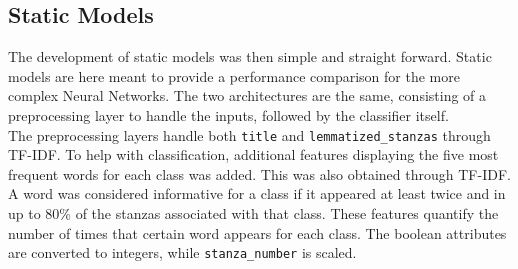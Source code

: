 \subsection*{Static Models}

The development of static models was then simple and straight forward.
Static models are here meant to provide a performance comparison
for the more complex Neural Networks.
The two architectures are the same, consisting of a preprocessing
layer to handle the inputs, followed by the classifier itself.\\

The preprocessing layers handle both \texttt{title} and
\texttt{lemmatized\_stanzas} through TF-IDF. 
To help with classification, additional features displaying the five most
frequent words for each class was added.
This was also obtained through TF-IDF.
A word was considered informative for a class if it appeared at
least twice and in up to 80\% of the stanzas associated with that class.
These features quantify the number of times that certain word appears for each
class.
% 
% 
The boolean attributes are converted to integers, while \texttt{stanza\_number}
is scaled.\\

